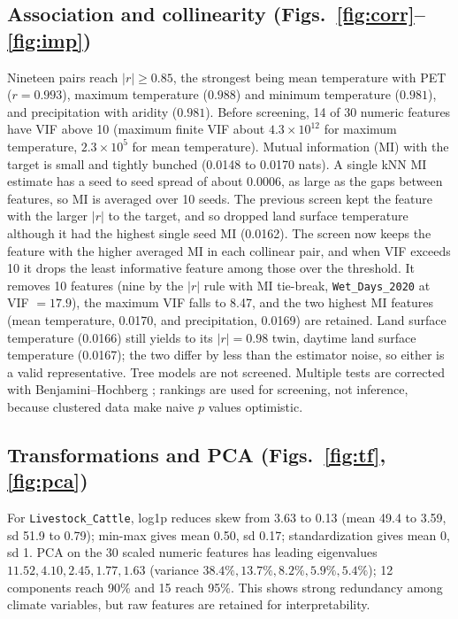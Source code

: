 \documentclass[11pt]{article}
\begin{document}
\subsection{Association and collinearity (Figs.~\ref{fig:corr}--\ref{fig:imp})}
Nineteen pairs reach $|r|\ge0.85$, the strongest being mean temperature with PET ($r=0.993$), maximum temperature ($0.988$) and minimum temperature ($0.981$), and precipitation with aridity ($0.981$). Before screening, 14 of 30 numeric features have VIF above 10 (maximum finite VIF about $4.3\times10^{12}$ for maximum temperature, $2.3\times10^{5}$ for mean temperature). Mutual information (MI) with the target is small and tightly bunched (0.0148 to 0.0170 nats). A single kNN MI estimate has a seed to seed spread of about 0.0006, as large as the gaps between features, so MI is averaged over 10 seeds. The previous screen kept the feature with the larger $|r|$ to the target, and so dropped land surface temperature although it had the highest single seed MI (0.0162). The screen now keeps the feature with the higher averaged MI in each collinear pair, and when VIF exceeds 10 it drops the least informative feature among those over the threshold. It removes 10 features (nine by the $|r|$ rule with MI tie-break, \texttt{Wet\_Days\_2020} at VIF $=17.9$), the maximum VIF falls to 8.47, and the two highest MI features (mean temperature, 0.0170, and precipitation, 0.0169) are retained. Land surface temperature (0.0166) still yields to its $|r|=0.98$ twin, daytime land surface temperature (0.0167); the two differ by less than the estimator noise, so either is a valid representative. Tree models are not screened. Multiple tests are corrected with Benjamini--Hochberg \cite{benjamini1995}; rankings are used for screening, not inference, because clustered data make naive $p$ values optimistic.

\subsection{Transformations and PCA (Figs.~\ref{fig:tf}, \ref{fig:pca})}
For \texttt{Livestock\_Cattle}, log1p reduces skew from 3.63 to 0.13 (mean 49.4 to 3.59, sd 51.9 to 0.79); min-max gives mean 0.50, sd 0.17; standardization gives mean 0, sd 1. PCA on the 30 scaled numeric features has leading eigenvalues $11.52, 4.10, 2.45, 1.77, 1.63$ (variance $38.4\%, 13.7\%, 8.2\%, 5.9\%, 5.4\%$); 12 components reach 90\% and 15 reach 95\%. This shows strong redundancy among climate variables, but raw features are retained for interpretability.
\end{document}
